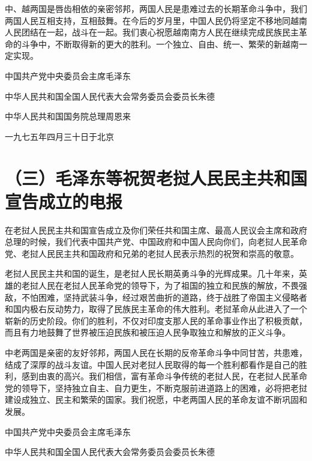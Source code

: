 中、越两国是唇齿相依的亲密邻邦，两国人民是患难过去的长期革命斗争中，我们两国人民互相支持，互相鼓舞。在今后的岁月里，中国人民仍将坚定不移地同越南人民团结在一起，战斗在一起。我们衷心祝愿越南南方人民在继续完成民族民主革命的斗争中，不断取得新的更大的胜利。一个独立、自由、统一、繁荣的新越南一定实现。

中国共产党中央委员会主席毛泽东

中华人民共和国全国人民代表大会常务委员会委员长朱德

中华人民共和国国务院总理周恩来

一九七五年四月三十日于北京

\date{一九七五年十二月五日}
\section*{（三）毛泽东等祝贺老挝人民民主共和国宣告成立的电报}







在老挝人民民主共和国宣告成立及你们荣任共和国主席、最高人民议会主席和政府总理的时候，我们代表中国共产党、中国政府和中国人民向你们，向老挝人民革命党、老挝人民民主共和国政府和兄弟的老挝人民表示热烈的祝贺和崇高的敬意。

老挝人民民主共和国的诞生，是老挝人民长期英勇斗争的光辉成果。几十年来，英雄的老挝人民在老挝人民革命党的领导下，为了祖国的独立和民族的解放，不畏强敌，不怕困难，坚持武装斗争，经过艰苦曲折的道路，终于战胜了帝国主义侵略者和国内极右反动势力，取得了民族民主革命的伟大胜利。老挝革命从此进入了一个崭新的历史阶段。你们的胜利，不仅对印度支那人民的革命事业作出了积极贡献，而且有力地鼓舞了世界被压迫民族和被压迫人民争取独立和解放的正义斗争。

中老两国是亲密的友好邻邦，两国人民在长期的反帝革命斗争中同甘苦，共患难，结成了深厚的战斗友谊。中国人民对老挝人民取得的每一个胜利都看作是自己的胜利，感到由衷的高兴。我们相信，富有革命斗争传统的老挝人民，在老挝人民革命党的领导下，坚持独立自主、自力更生，不断克服前进道路上的困难，必将把老挝建设成独立、民主和繁荣的国家。我们祝愿，中老两国人民的革命友谊不断巩固和发展。

中国共产党中央委员会主席毛泽东

中华人民共和国全国人民代表大会常务委员会委员长朱德

